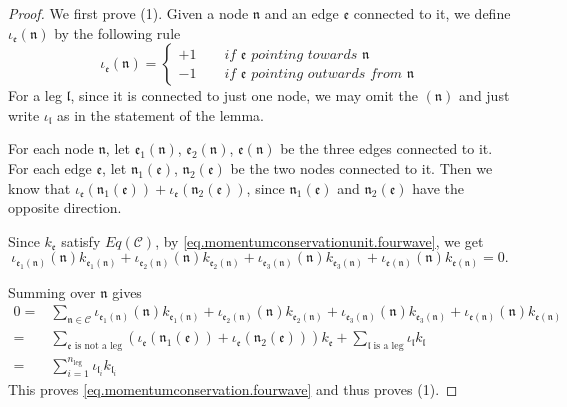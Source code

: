 \begin{proof}
We first prove (1). Given a node $\mathfrak{n}$ and an edge $\mathfrak{e}$ connected to it, we define $\iota_{\mathfrak{e}}(\mathfrak{n})$ by the following rule
\begin{equation}
\iota_{\mathfrak{e}}(\mathfrak{n})=\begin{cases}
 +1 \qquad \textit{if $\mathfrak{e}$ pointing towards $\mathfrak{n}$}
 \\
 -1 \qquad \textit{if $\mathfrak{e}$ pointing outwards from $\mathfrak{n}$}
\end{cases}
\end{equation}
For a leg $\mathfrak{l}$, since it is connected to just one node, we may omit the $(\mathfrak{n})$ and just write $\iota_{\mathfrak{l}}$ as in the statement of the lemma.

For each node $\mathfrak{n}$, let $\mathfrak{e}_1(\mathfrak{n})$, $\mathfrak{e}_2(\mathfrak{n})$, $\mathfrak{e}(\mathfrak{n})$ be the three edges connected to it. For each edge $\mathfrak{e}$, let $\mathfrak{n}_1(\mathfrak{e})$, $\mathfrak{n}_2(\mathfrak{e})$ be the two nodes connected to it. Then we know that $\iota_{\mathfrak{e}}(\mathfrak{n}_1(\mathfrak{e}))+\iota_{\mathfrak{e}}(\mathfrak{n}_2(\mathfrak{e}))$, since $\mathfrak{n}_1(\mathfrak{e})$ and $\mathfrak{n}_2(\mathfrak{e})$ have the opposite direction. 

Since $k_{\mathfrak{e}}$ satisfy $Eq(\mathcal{C})$, by \eqref{eq.momentumconservationunit.fourwave}, we get 
\begin{equation}
 \iota_{\mathfrak{e}_1(\mathfrak{n})}(\mathfrak{n})k_{\mathfrak{e}_1(\mathfrak{n})}+\iota_{\mathfrak{e}_2(\mathfrak{n})}(\mathfrak{n})k_{\mathfrak{e}_2(\mathfrak{n})}+\iota_{\mathfrak{e}_3(\mathfrak{n})}(\mathfrak{n})k_{\mathfrak{e}_3(\mathfrak{n})}+\iota_{\mathfrak{e}(\mathfrak{n})}(\mathfrak{n})k_{\mathfrak{e}(\mathfrak{n})}=0.
\end{equation}

Summing over $\mathfrak{n}$ gives 
\begin{equation}
\begin{split}
 0=&\sum_{\mathfrak{n}\in \mathcal{C}}\iota_{\mathfrak{e}_1(\mathfrak{n})}(\mathfrak{n})k_{\mathfrak{e}_1(\mathfrak{n})}+\iota_{\mathfrak{e}_2(\mathfrak{n})}(\mathfrak{n})k_{\mathfrak{e}_2(\mathfrak{n})}+\iota_{\mathfrak{e}_3(\mathfrak{n})}(\mathfrak{n})k_{\mathfrak{e}_3(\mathfrak{n})}+\iota_{\mathfrak{e}(\mathfrak{n})}(\mathfrak{n})k_{\mathfrak{e}(\mathfrak{n})}
 \\
 =& \sum_{\mathfrak{e}\text{ is not a leg}} 
 (\iota_{\mathfrak{e}}(\mathfrak{n}_1(\mathfrak{e}))+\iota_{\mathfrak{e}}(\mathfrak{n}_2(\mathfrak{e}))) k_{\mathfrak{e}}+ \sum_{\mathfrak{l}\text{ is a leg}} 
 \iota_{\mathfrak{l}} k_{\mathfrak{l}}
 \\
 =& \sum_{i=1}^{n_{\text{leg}}} \iota_{\mathfrak{l}_i}k_{\mathfrak{l}_i}
\end{split}
\end{equation}
This proves \eqref{eq.momentumconservation.fourwave} and thus proves (1).


\end{proof}
